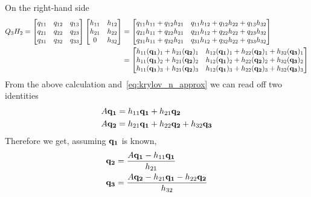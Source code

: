 \begin{example}
	On the right-hand side
	\begin{align*}
		Q_3 H_2 =
		\begin{bmatrix}
			q_{11} & q_{12} & q_{13} \\
			q_{21} & q_{22} & q_{23} \\
			q_{31} & q_{32} & q_{33}
		\end{bmatrix}
		\begin{bmatrix}
			h_{11} & h_{12} \\
			h_{21} & h_{22} \\
			0      & h_{32}
		\end{bmatrix}
		 & =
		\begin{bmatrix}
			q_{11}h_{11} + q_{12}h_{21} & q_{11}h_{12} + q_{12}h_{22} + q_{13}h_{32} \\
			q_{21}h_{11} + q_{22}h_{21} & q_{21}h_{12} + q_{22}h_{22} + q_{23}h_{32} \\
			q_{31}h_{11} + q_{32}h_{21} & q_{31}h_{12} + q_{32}h_{22}+ q_{33}h_{32}
		\end{bmatrix} \\
		 & =
		\begin{bmatrix}
			h_{11}(\vectorbold{q_1})_1 + h_{21}(\vectorbold{q_2})_1 & h_{12}(\vectorbold{q_1})_1 + h_{22}(\vectorbold{q_2})_1 + h_{32}(\vectorbold{q_3})_1 \\
			h_{11}(\vectorbold{q_1})_2 + h_{21}(\vectorbold{q_2})_2 & h_{12}(\vectorbold{q_1})_2 + h_{22}(\vectorbold{q_2})_2 + h_{32}(\vectorbold{q_3})_2 \\
			h_{11}(\vectorbold{q_1})_3 + h_{21}(\vectorbold{q_2})_3 & h_{12}(\vectorbold{q_1})_3 + h_{22}(\vectorbold{q_2})_3 + h_{32}(\vectorbold{q_3})_3
		\end{bmatrix}
	\end{align*}
	From the above calculation and~\ref{eq:krylov_n_approx} we can read off two identities
	\begin{align*}
		A\vectorbold{q_1} & = h_{11}\vectorbold{q_1}+h_{21}\vectorbold{q_2}                          \\
		A\vectorbold{q_2} & = h_{21}\vectorbold{q_1}+h_{22}\vectorbold{q_2} + h_{32}\vectorbold{q_3}
	\end{align*}
	Therefore we get, assuming \(\vectorbold{q_1}\) is known,
	\begin{align*}
		\vectorbold{q_2} & = \frac{A \vectorbold{q_1} - h_{11} \vectorbold{q_1}}{h_{21}}                          \\
		\vectorbold{q_3} & = \frac{A \vectorbold{q_2} - h_{21} \vectorbold{q_1} - h_{22}\vectorbold{q_2}}{h_{32}}
	\end{align*}
\end{example}
